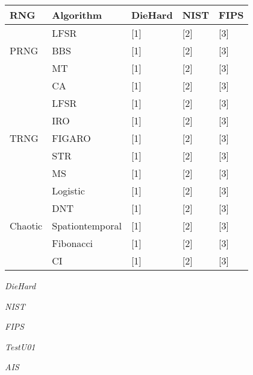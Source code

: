 
\begin{table}[h]
\begin{tabular}{|l|l|l|l|l|}
\hline
RNG  & Algorithm & DieHard & NIST & FIPS   \\ \hline
 	 & LFSR & {[1]} & {[2]} & {[3]}    \\ \cline{2-5} 
PRNG & BBS & {[1]} & {[2]} & {[3]}     \\ \cline{2-5} 
	 & MT & {[1]} & {[2]} & {[3]}     \\ \cline{2-5}
	 & CA & {[1]} & {[2]} & {[3]}     \\ \hline	 
 	 & LFSR & {[1]} & {[2]} & {[3]}     \\ \cline{2-5} 
	 & IRO & {[1]} & {[2]} & {[3]}     \\ \cline{2-5} 
TRNG & FIGARO & {[1]} & {[2]} & {[3]}     \\ \cline{2-5}
	 & STR & {[1]} & {[2]} & {[3]}     \\ \cline{2-5}
	 & MS & {[1]} & {[2]} & {[3]}     \\ \hline	 
  	 & Logistic & {[1]} & {[2]} & {[3]}     \\ \cline{2-5} 
	 & DNT & {[1]} & {[2]} & {[3]}     \\ \cline{2-5} 
Chaotic	 & Spationtemporal & {[1]} & {[2]} & {[3]}     \\ \cline{2-5}
	 & Fibonacci & {[1]} & {[2]} & {[3]}     \\ \cline{2-5}
	 & CI & {[1]} & {[2]} & {[3]}     \\ \hline
\end{tabular}
\end{table}

\textit{DieHard}

\textit{NIST}

\textit{FIPS}

\textit{TestU01}

\textit{AIS}

